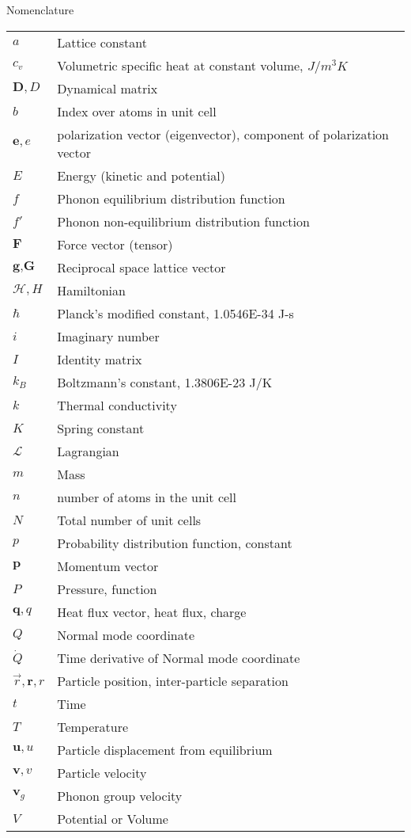 \setlength{\LTleft}{0pt}
Nomenclature\\
\begin{longtable}{ l l }
$a$ & Lattice constant \\
$c_v$ & Volumetric specific heat at constant volume, $J/m^3K$\\
$\pmb{D},D$ & Dynamical matrix\\
$b$ & Index over atoms in unit cell \\
$\textbf{e},e$ & polarization vector (eigenvector), component of polarization vector\\
$E$ & Energy (kinetic and potential)\\
$f$ & Phonon equilibrium distribution function\\
$f'$ & Phonon non-equilibrium distribution function\\
$\textbf{F}$ & Force vector (tensor)\\
$\textbf{g},\textbf{G}$ & Reciprocal space lattice vector\\
$\mathscr{H}, H$ & Hamiltonian \\
$\hbar$ & Planck's modified constant, 1.0546E-34 J-s\\
$i$ & Imaginary number\\
$I$ & Identity matrix\\
$k_B$ & Boltzmann's constant, 1.3806E-23 J/K\\
$k$ & Thermal conductivity\\
$K$ & Spring constant\\
$\mathscr{L}$ & Lagrangian \\
$m$ & Mass\\
$n$ & number of atoms in the unit cell\\
$N$ & Total number of unit cells\\
$p$ & Probability distribution function, constant\\
$\textbf{p}$ & Momentum vector\\
$P$ & Pressure, function\\
$\textbf{q},q$ & Heat flux vector, heat flux, charge\\
$Q$ & Normal mode coordinate\\
$\dot{Q}$ & Time derivative of Normal mode coordinate\\
$\vec{r},\textbf{r},r$ & Particle position, inter-particle separation\\
$t$ & Time\\
$T$ & Temperature\\
$\textbf{u},u$ & Particle displacement from equilibrium\\
$\textbf{v},v$ & Particle velocity\\
$\textbf{v}_g$ & Phonon group velocity\\
$V$ & Potential or Volume\\
\end{longtable}

